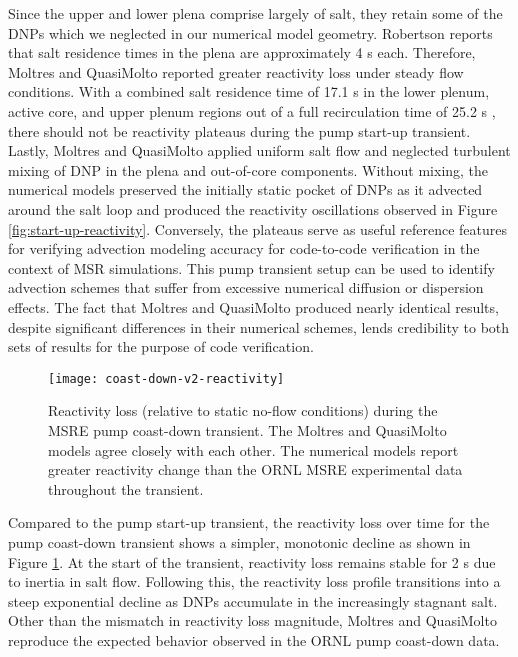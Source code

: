 Since the upper and lower plena comprise largely of salt, they retain some of the \glspl{DNP} which
we neglected in our numerical model geometry. Robertson \cite{robertson_msre_1965} reports that
salt residence times in the plena are approximately 4 s each. Therefore, Moltres and QuasiMolto
reported greater reactivity loss under steady flow conditions. With a combined salt residence time
of 17.1 s in the lower plenum, active core, and upper
plenum regions out of a full recirculation time of 25.2 s \cite{robertson_msre_1965}, there should
not be reactivity plateaus during the pump start-up transient. Lastly, Moltres and QuasiMolto
applied uniform salt flow and neglected turbulent mixing of \gls{DNP} in the plena and out-of-core
components. Without mixing, the numerical models preserved the initially static pocket of
\glspl{DNP} as it advected around the salt loop and produced the reactivity oscillations observed
in Figure \ref{fig:start-up-reactivity}. Conversely, the plateaus serve as
useful reference features for verifying advection modeling accuracy for code-to-code verification
in the context of \gls{MSR} simulations. This pump transient setup can be used to identify
advection schemes that suffer from excessive numerical diffusion or dispersion effects. The fact
that Moltres and QuasiMolto produced nearly identical results, despite significant differences in
their numerical schemes, lends credibility to both sets of results for the purpose of code
verification.

\begin{figure}[t]
  \centering
  \texttt{[image: coast-down-v2-reactivity]}
  \caption{Reactivity loss (relative to static no-flow conditions) during the \gls{MSRE} pump
  coast-down transient. The Moltres and QuasiMolto models agree closely with each other. The
  numerical models report greater reactivity change than the \gls{ORNL} \gls{MSRE} experimental
  data throughout the transient.}
  \label{fig:coast-down-reactivity}
\end{figure}

Compared to the pump start-up transient, the reactivity loss over time for the pump coast-down
transient shows a simpler, monotonic decline as shown in Figure \ref{fig:coast-down-reactivity}.
At the start of the transient, reactivity loss remains stable for 2 s due to inertia in salt flow.
Following this, the reactivity loss profile transitions into a steep exponential decline as
\glspl{DNP} accumulate in the increasingly stagnant salt. Other than the mismatch in reactivity
loss magnitude, Moltres and QuasiMolto reproduce the expected behavior observed in the \gls{ORNL}
pump coast-down data.

